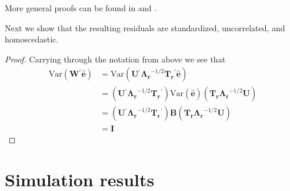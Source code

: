\documentclass{article} %
\newcommand{\trans}{\ensuremath{^\prime}}
\newcommand{\var}{\ensuremath{\mathrm{Var}}}
\begin{document}
More general proofs can be found in \cite{McDonald:1979ca} and \cite{deLeeuw:1982to}.

Next we show that the resulting residuals are standardized, uncorrelated, and homoscedastic.

\begin{proof} Carrying through the notation from above we see that
\begin{align*}
\var(\bm{W}\trans \widehat{\bm{e}}) &= \var(\bm{U}\trans \bm{\Lambda_r}^{-1/2} \bm{T_r}\trans \widehat{\bm{e}})\\
&= (\bm{U}\trans \bm{\Lambda_r}^{-1/2} \bm{T_r}\trans) \var(\widehat{\bm{e}}) (\bm{T_r \Lambda_r}^{-1/2} \bm{U})\\
&= (\bm{U}\trans \bm{\Lambda_r}^{-1/2} \bm{T_r}\trans) \bm{B} (\bm{T_r \Lambda_r}^{-1/2} \bm{U})\\
&= \bm{I}
\end{align*}

\end{proof}





\section*{Simulation results}


\end{document}

